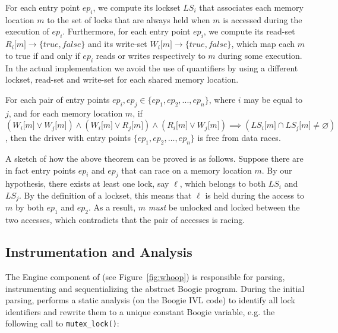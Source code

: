 For each entry point $\mathit{ep}_{i}$, we compute its lockset $\mathit{LS}_{i}$ that associates each memory location $m$ to the set of locks that are always held when $m$ is accessed during the execution of $\mathit{ep}_{i}$. Furthermore, for each entry point $\mathit{ep}_{i}$, we compute its read-set $R_{i}\lbrack m\rbrack \rightarrow \{true, false\}$ and its write-set $W_{i}\lbrack m\rbrack \rightarrow \{true, false\}$, which map each $m$ to true if and only if $\mathit{ep}_{i}$ reads or writes respectively to $m$ during some execution. In the actual implementation we avoid the use of quantifiers by using a different lockset, read-set and write-set for each shared memory location.

\begin{theorem}
\label{theorem:locksets}
For each pair of entry points $\mathit{ep}_{i}, \mathit{ep}_{j}\in \{\mathit{ep}_{1}, \mathit{ep}_{2}, ..., \mathit{ep}_{n}\}$, where $i$ may be equal to $j$, and for each memory location $m$, if $(W_{i}\lbrack m\rbrack \vee W_{j}\lbrack m\rbrack) \wedge (W_{i}\lbrack m\rbrack \vee R_{j}\lbrack m\rbrack) \wedge (R_{i}\lbrack m\rbrack \vee W_{j}\lbrack m\rbrack) \implies (\mathit{LS}_{i}\lbrack m\rbrack \cap \mathit{LS}_{j}\lbrack m\rbrack \not= \varnothing)$, then the driver with entry points $\{\mathit{ep}_{1}, \mathit{ep}_{2}, \dotsc, \mathit{ep}_{n}\}$ is free from data races.
\end{theorem}

A sketch of how the above theorem can be proved is as follows. Suppose there are in fact entry points $\mathit{ep}_{i}$ and $\mathit{ep}_{j}$ that can race on a memory location $m$. By our hypothesis, there exists at least one lock, say $\ell$, which belongs to both $\mathit{LS}_{i}$ and $\mathit{LS}_{j}$. By the definition of a lockset, this means that $\ell$ is held during the access to $m$ by both $ep_1$ and $ep_2$. As a result, $m$ \emph{must} be unlocked and locked between the two accesses, which contradicts that the pair of accesses is racing.

\subsection{Instrumentation and Analysis}
\label{whoop:method}

The Engine component of \whoop (see Figure~\ref{fig:whoop}) is responsible for parsing, instrumenting and sequentializing the abstract Boogie program. During the initial parsing, \whoop performs a static analysis (on the Boogie IVL code) to identify all lock identifiers and rewrite them to a unique constant Boogie variable, e.g. the following call to \texttt{mutex\_lock()}:

